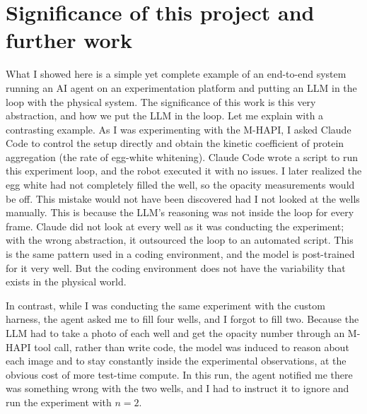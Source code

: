 \documentclass[11pt,letterpaper]{article}
\newcommand{\mhapi}{M-HAPI}
\begin{document}
\section{Significance of this project and further work}

What I showed here is a simple yet complete example of an end-to-end system running an AI agent
on an experimentation platform and putting an LLM in the loop with the physical system. The
significance of this work is this very abstraction, and how we put the LLM in the loop. Let me
explain with a contrasting example. As I was experimenting with the \mhapi, I asked Claude Code to
control the setup directly and obtain the kinetic coefficient of protein aggregation (the rate of
egg-white whitening). Claude Code wrote a script to run this experiment loop, and the robot
executed it with no issues. I later realized the egg white had not completely filled the well, so
the opacity measurements would be off. This mistake would not have been discovered had I not
looked at the wells manually. This is because the LLM's reasoning was not inside the loop for
every frame. Claude did not look at every well as it was conducting the experiment; with the wrong
abstraction, it outsourced the loop to an automated script. This is the same pattern used in a
coding environment, and the model is post-trained for it very well. But the coding environment
does not have the variability that exists in the physical world.

In contrast, while I was conducting the same experiment with the custom harness, the agent asked
me to fill four wells, and I forgot to fill two. Because the LLM had to take a
photo of each well and get the opacity number through an \mhapi{} tool call, rather than write
code, the model was induced to reason about each image and to stay constantly inside the
experimental observations, at the obvious cost of more test-time compute. In this run, the agent notified me there was something wrong with the two wells, and I had to instruct it to ignore and run the experiment with $n=2$.
\end{document}
